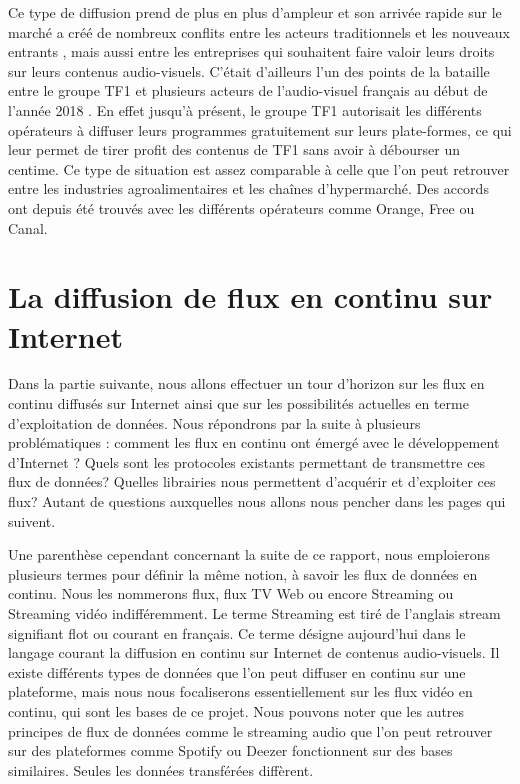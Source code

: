 \documentclass{polytech/polytech}
\begin{document}
Ce type de diffusion prend de plus en plus d'ampleur et son arrivée rapide sur le marché a créé de nombreux conflits entre les acteurs traditionnels et les nouveaux entrants \cite{_lott_2013}, mais aussi entre les entreprises qui souhaitent faire valoir leurs droits sur leurs contenus audio-visuels. C'était d'ailleurs l'un des points de la bataille entre le groupe TF1 et plusieurs acteurs de l'audio-visuel français au début de l'année 2018 \cite{_guerre_2018}. En effet jusqu'à présent, le groupe TF1 autorisait les différents opérateurs à diffuser leurs programmes gratuitement sur leurs plate-formes, ce qui leur permet de tirer profit des contenus de TF1 sans avoir à débourser un centime. Ce type de situation est assez comparable à celle que l'on peut retrouver entre les industries agroalimentaires et les chaînes d'hypermarché. Des accords ont depuis été trouvés avec les différents opérateurs comme Orange, Free ou Canal.


\chapter{La diffusion de flux en continu sur Internet}
\label{chap:diffusion_flux}

Dans la partie suivante, nous allons effectuer un tour d’horizon sur les flux en continu diffusés sur Internet ainsi que sur les possibilités actuelles en terme d’exploitation de données. Nous répondrons par la suite à plusieurs problématiques : comment les flux en continu ont émergé avec le développement d’Internet ? Quels sont les protocoles existants permettant de transmettre ces flux de données? Quelles librairies nous permettent d’acquérir et d’exploiter ces flux? Autant de questions auxquelles nous allons nous pencher dans les pages qui suivent.

Une parenthèse cependant concernant la suite de ce rapport, nous emploierons plusieurs termes pour définir la même notion, à savoir les flux de données en continu. Nous les nommerons flux, flux TV Web ou encore Streaming ou Streaming vidéo indifféremment. Le terme Streaming est tiré de l’anglais stream signifiant flot ou courant en français. Ce terme désigne aujourd’hui dans le langage courant la diffusion en continu sur Internet de contenus audio-visuels. Il existe différents types de données que l’on peut diffuser en continu sur une plateforme, mais nous nous focaliserons essentiellement sur les flux vidéo en continu, qui sont les bases de ce projet. Nous pouvons noter que les autres principes de flux de données comme le streaming audio que l’on peut retrouver sur des plateformes comme Spotify ou Deezer fonctionnent sur des bases similaires. Seules les données transférées diffèrent.
\end{document}
